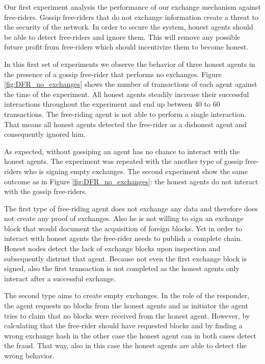 Our first experiment analysis the performance of our exchange mechanism against free-riders. Gossip
free-riders that do not exchange information create a threat to the security of the network. In order
to secure the system, honest agents should be able to detect free-riders and ignore them. This will 
remove any possible future profit from free-riders which should incentivize them to become honest.

In this first set of experiments we observe the behavior of three honest agents in the presence of 
a gossip free-rider that performs no exchanges. Figure \ref{fig:DFR_no_exchanges} shows the number of transactions of each 
agent against the time of the experiment. All honest agents steadily increase their successful 
interactions throughout the experiment and end up between 40 to 60 transactions. The free-riding agent
is not able to perform a single interaction. That means all honest agents detected the free-rider 
as a dishonest agent and consequently ignored him. 

As expected, without gossiping an agent has no chance to interact with the honest agents. The 
experiment was repeated with the another type of gossip free-riders who is signing empty exchanges. 
The second experiment show the same outcome as in Figure \ref{fig:DFR_no_exchanges}:
the honest agents do not interact with the gossip free-riders.

The first type of free-riding agent does not exchange any data and therefore does not create any 
proof of exchanges. Also he is not willing to sign an exchange block that would document the acquisition
of foreign blocks. Yet in order to interact with honest agents the free-rider needs 
to publish a complete chain. Honest nodes detect the lack of exchange blocks upon inspection and 
subsequently distrust that agent. Because not even the first exchange block is signed, also the first
transaction is not completed as the honest agents only interact after a successful exchange.

The second type aims to create empty exchanges. In the role of the responder, the agent requests no 
blocks from the honest agents and as initiator the agent tries to claim that no blocks were received 
from the honest agent. However, by calculating 
that the free-rider should have requested blocks and by finding a wrong exchange hash in the other case
the honest agent can in both cases detect the fraud. That way, also in this case the honest agents 
are able to detect the wrong behavior.

